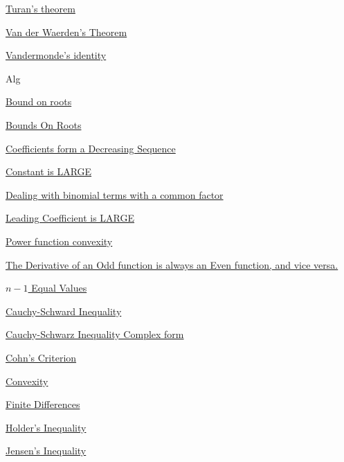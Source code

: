 \hyperref  [theorem:Turan's theorem]{Turan's theorem}

\hyperref  [theorem:Van der Waerden's Theorem]{Van der Waerden's Theorem}

\hyperref  [theorem:Vandermonde's identity]{Vandermonde's identity}




\newpage Alg


\hyperref  [lemma:]{}

\hyperref  [lemma:]{}

\hyperref  [lemma:]{}

\hyperref  [lemma:]{}

\hyperref  [lemma:]{}

\hyperref  [lemma:Bound on roots]{Bound on roots}

\hyperref  [lemma:Bounds On Roots]{Bounds On Roots}

\hyperref  [lemma:Coefficients form a Decreasing Sequence]{Coefficients form a Decreasing Sequence}

\hyperref  [lemma:Constant is LARGE]{Constant is LARGE}

\hyperref  [lemma:Dealing with binomial terms with a common factor]{Dealing with binomial terms with a common factor}

\hyperref  [lemma:Leading Coefficient is LARGE]{Leading Coefficient is LARGE}

\hyperref  [lemma:Power function convexity]{Power function convexity}

\hyperref  [lemma:The Derivative of an Odd function is always an Even function, and vice versa.]{The Derivative of an Odd function is always an Even function, and vice versa.}

\hyperref  [theorem:$ n-1 $ Equal Values]{$ n-1 $ Equal Values}

\hyperref  [theorem:Cauchy-Schward Inequality]{Cauchy-Schward Inequality}

\hyperref  [theorem:Cauchy-Schwarz Inequality Complex form]{Cauchy-Schwarz Inequality Complex form}

\hyperref  [theorem:Cohn's Criterion]{Cohn's Criterion}

\hyperref  [theorem:Convexity]{Convexity}

\hyperref  [theorem:Finite Differences]{Finite Differences}

\hyperref  [theorem:Holder's Inequality]{Holder's Inequality}

\hyperref  [theorem:Jensen's Inequality]{Jensen's Inequality}

